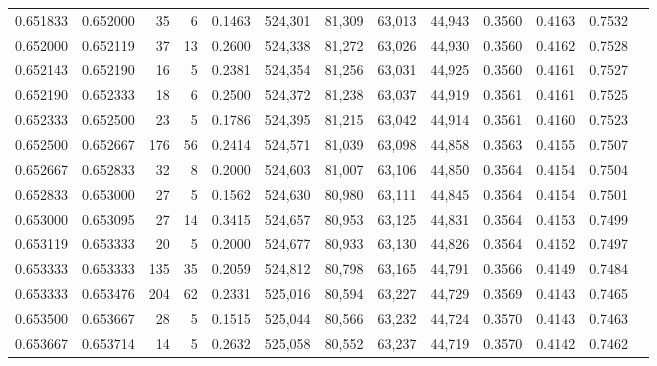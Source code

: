 \begin{tabular}{rrrrrrrrrrrrr}
0.651833 & 0.652000 &    35 &   6 &                                     0.1463 & 524,301 &  81,309 &  63,013 &  44,943 & 0.3560 & 0.4163 & 0.7532 \\
0.652000 & 0.652119 &    37 &  13 &                                     0.2600 & 524,338 &  81,272 &  63,026 &  44,930 & 0.3560 & 0.4162 & 0.7528 \\
0.652143 & 0.652190 &    16 &   5 &                                     0.2381 & 524,354 &  81,256 &  63,031 &  44,925 & 0.3560 & 0.4161 & 0.7527 \\
0.652190 & 0.652333 &    18 &   6 &                                     0.2500 & 524,372 &  81,238 &  63,037 &  44,919 & 0.3561 & 0.4161 & 0.7525 \\
0.652333 & 0.652500 &    23 &   5 &                                     0.1786 & 524,395 &  81,215 &  63,042 &  44,914 & 0.3561 & 0.4160 & 0.7523 \\
0.652500 & 0.652667 &   176 &  56 &                                     0.2414 & 524,571 &  81,039 &  63,098 &  44,858 & 0.3563 & 0.4155 & 0.7507 \\
0.652667 & 0.652833 &    32 &   8 &                                     0.2000 & 524,603 &  81,007 &  63,106 &  44,850 & 0.3564 & 0.4154 & 0.7504 \\
0.652833 & 0.653000 &    27 &   5 &                                     0.1562 & 524,630 &  80,980 &  63,111 &  44,845 & 0.3564 & 0.4154 & 0.7501 \\
0.653000 & 0.653095 &    27 &  14 &                                     0.3415 & 524,657 &  80,953 &  63,125 &  44,831 & 0.3564 & 0.4153 & 0.7499 \\
0.653119 & 0.653333 &    20 &   5 &                                     0.2000 & 524,677 &  80,933 &  63,130 &  44,826 & 0.3564 & 0.4152 & 0.7497 \\
0.653333 & 0.653333 &   135 &  35 &                                     0.2059 & 524,812 &  80,798 &  63,165 &  44,791 & 0.3566 & 0.4149 & 0.7484 \\
0.653333 & 0.653476 &   204 &  62 &                                     0.2331 & 525,016 &  80,594 &  63,227 &  44,729 & 0.3569 & 0.4143 & 0.7465 \\
0.653500 & 0.653667 &    28 &   5 &                                     0.1515 & 525,044 &  80,566 &  63,232 &  44,724 & 0.3570 & 0.4143 & 0.7463 \\
0.653667 & 0.653714 &    14 &   5 &                                     0.2632 & 525,058 &  80,552 &  63,237 &  44,719 & 0.3570 & 0.4142 & 0.7462 \\

\end{tabular}
